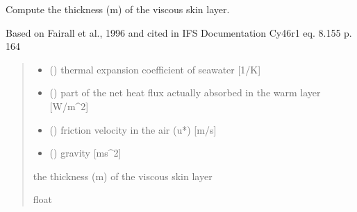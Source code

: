 \documentclass[letterpaper,10pt,english]{sphinxmanual}
\begin{document}
\begin{fulllineitems}
\label{\detokenize{users_guide:AirSeaFluxCode.cs_wl_subs.delta}}
\pysigstartsignatures
{}
\pysigstopsignatures
\sphinxAtStartPar
Compute the thickness (m) of the viscous skin layer.

\sphinxAtStartPar
Based on Fairall et al., 1996 and cited in IFS Documentation Cy46r1
eq. 8.155 p. 164
\begin{quote}\begin{description}
\begin{itemize}
\item {} 
\sphinxAtStartPar
{} () \textendash{} thermal expansion coefficient of sea\sphinxhyphen{}water  {[}1/K{]}

\item {} 
\sphinxAtStartPar
{} () \textendash{} part of the net heat flux actually absorbed in the warm layer {[}W/m\textasciicircum{}2{]}

\item {} 
\sphinxAtStartPar
{} () \textendash{} friction velocity in the air (u*) {[}m/s{]}

\item {} 
\sphinxAtStartPar
{} () \textendash{} gravity                      {[}ms\textasciicircum{}\sphinxhyphen{}2{]}

\end{itemize}

\sphinxAtStartPar
{} \textendash{} the thickness (m) of the viscous skin layer

\sphinxAtStartPar
float

\end{description}\end{quote}

\end{fulllineitems}
\end{document}
